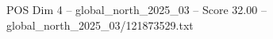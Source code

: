 \begin{textsample}{POS Dim 4 – global\_north\_2025\_03 – Score 32.00 – global\_north\_2025\_03/121873529.txt}
\end{textsample}
